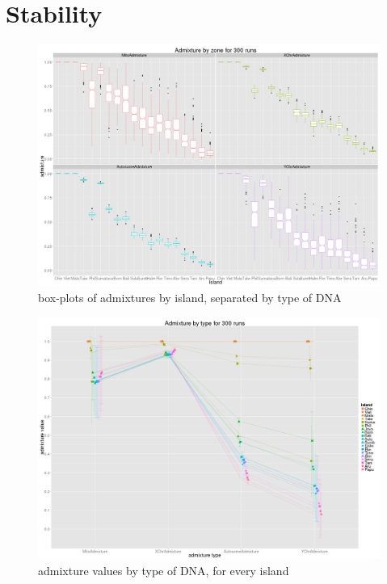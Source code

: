 \documentclass[a4paper,12pt]{report}
\begin{document}
\section{Stability}
\begin{figure}[ht]
	\centering
	\includegraphics[scale=0.22]{../data/stability.png}
	\caption{box-plots of admixtures by island, separated by type of DNA}
	\label{app:stability}
\end{figure}

\begin{figure}[ht]
	\centering
	\includegraphics[scale=0.22]{../data/stability-admixGradient.png}
	\caption{admixture values by type of DNA, for every island}
	\label{app:stability-admixGradient}
\end{figure}
\end{document}
